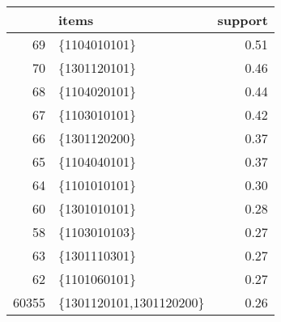 \begin{table}[ht]
\centering
\begin{tabular}{rlr}
  \hline
 & items & support \\ 
  \hline
69 & \{1104010101\} & 0.51 \\ 
  70 & \{1301120101\} & 0.46 \\ 
  68 & \{1104020101\} & 0.44 \\ 
  67 & \{1103010101\} & 0.42 \\ 
  66 & \{1301120200\} & 0.37 \\ 
  65 & \{1104040101\} & 0.37 \\ 
  64 & \{1101010101\} & 0.30 \\ 
  60 & \{1301010101\} & 0.28 \\ 
  58 & \{1103010103\} & 0.27 \\ 
  63 & \{1301110301\} & 0.27 \\ 
  62 & \{1101060101\} & 0.27 \\ 
  60355 & \{1301120101,1301120200\} & 0.26 \\ 
   \hline
\end{tabular}
\end{table}
